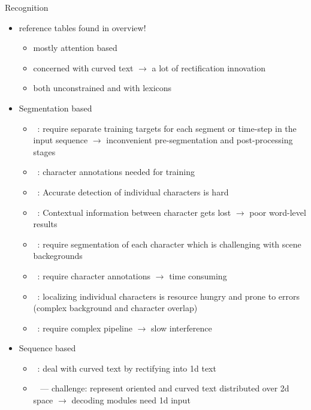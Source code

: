 Recognition
\begin{itemize}
    \item reference tables found in overview!
        \begin{itemize}
            \item mostly attention based
            \item concerned with curved text $\rightarrow$ a lot of rectification innovation
            \item both unconstrained and with lexicons
        \end{itemize}
    \item Segmentation based
        \begin{itemize}
            \item~\cite{xie_aggregation_2019}: require separate training targets for each segment
                or time-step in the input sequence $\rightarrow$ inconvenient pre-segmentation and
                post-processing stages
            \item~\cite{shi_end--end_2017}: character annotations needed for training
            \item~\citep{chen_text_2021}: Accurate detection of individual characters is hard
            \item~\citep{chen_text_2021}: Contextual information between character gets lost
                $\rightarrow$ poor word-level results
            \item~\cite{cheng_aon_2018}: require segmentation of each character which is challenging
                with scene backegrounds
            \item~\cite{cheng_aon_2018}: require character annotations $\rightarrow$ time consuming
            \item~\cite{zhan_esir_2019}: localizing individual characters is resource hungry and
                prone to errors (complex background and character overlap)
            \item~\cite{liu_abcnet_2020}: require complex pipeline $\rightarrow$ slow interference
        \end{itemize}
    \item Sequence based
        \begin{itemize}
            \item~\cite{li_show_2019}: deal with curved text by rectifying into 1d text
            \item~\cite{long_scene_2021} --- challenge: represent oriented and curved text
                distributed over 2d space $\rightarrow$ decoding modules need 1d input

\end{itemize}
\end{itemize}

